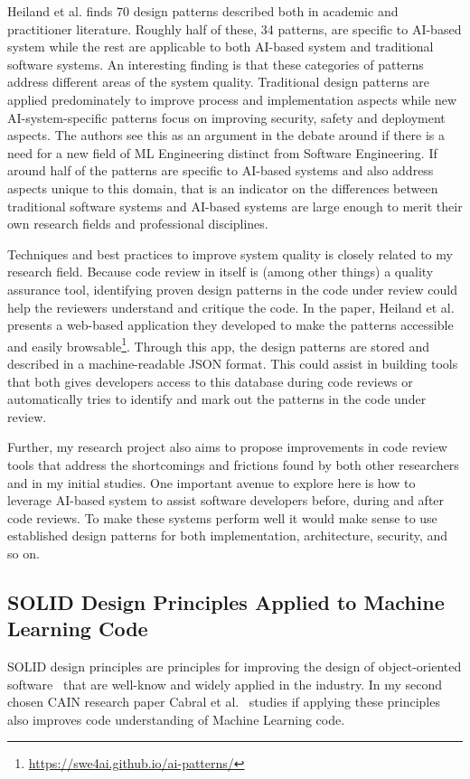 \documentclass[a4paper,twocolumn]{article}
\begin{document}
Heiland et al. finds 70 design patterns described both in academic and
practitioner literature. Roughly half of these, 34 patterns, are specific to
AI-based system while the rest are applicable to both AI-based system and
traditional software systems. An interesting finding is that these categories of
patterns address different areas of the system quality. Traditional design
patterns are applied predominately to improve process and implementation aspects
while new AI-system-specific patterns focus on improving security, safety and
deployment aspects. The authors see this as an argument in the debate around if
there is a need for a new field of ML Engineering distinct from Software
Engineering. If around half of the patterns are specific to AI-based systems and
also address aspects unique to this domain, that is an indicator on
the differences between traditional software systems and AI-based systems are
large enough to merit their own research fields and professional disciplines.

Techniques and best practices to improve system quality is closely related to my
research field. Because code review in itself is (among other things) a quality
assurance tool, identifying proven design patterns in the code under review
could help the reviewers understand and critique the code. In the paper, Heiland
et al. presents a web-based application they developed to make the patterns
accessible and easily
browsable\footnote{\url{https://swe4ai.github.io/ai-patterns/}}. 
Through this app, the design patterns are stored and described in a
machine-readable JSON format. This could assist in building tools that both
gives developers access to this database during code reviews or automatically
tries to identify and mark out the patterns in the code under review.

Further, my research project also aims to propose improvements in code review
tools that address the shortcomings and frictions found by both other
researchers and in my initial studies. One important avenue to explore here is
how to leverage AI-based system to assist software developers before,
during and after code reviews. To make these systems perform well it would make
sense to use established design patterns for both implementation, architecture,
security, and so on.

\subsection{SOLID Design Principles Applied to Machine Learning Code}

SOLID design principles are principles for improving the design of
object-oriented software~\cite{Martin2009} that are well-know and widely applied
in the industry. In my second chosen CAIN research paper Cabral et
al.~\cite{Cabral2024} studies if applying these principles also improves code
understanding of Machine Learning code. 



\end{document}
